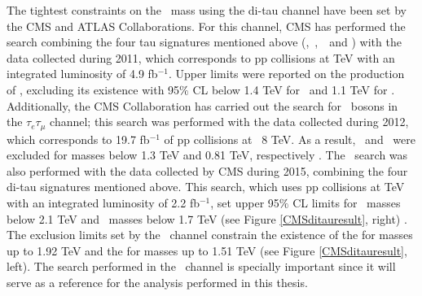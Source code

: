 \begin{itemize}
\noindent The tightest constraints on the \Zprime~mass using the di-tau channel have 
been set by the CMS and ATLAS Collaborations. For this channel, CMS has performed the search combining the four
 tau signatures mentioned above (\tauh \tauh,~\taue \tauh,~\taumu \tauh~and \taue \taumu)
with the data collected during 2011, which corresponds to pp collisions at  TeV with 
an integrated luminosity of 4.9 fb$^{-1}$. Upper limits were reported on the production of \Zprime, excluding 
its existence with 95$\%$ CL below 1.4 TeV for \ZprimeSSM~and 1.1 TeV for \Zprimepsi \cite{CMSZprimetotautaurun1}. Additionally, 
the CMS Collaboration has carried out the search for \Zprime~bosons in the $\tau_{e}\tau_{\mu}$ channel; this search 
was performed with the data collected during 2012, which corresponds to 19.7 fb$^{-1}$ of pp collisions at \sqrts~8 TeV.
As a result, \ZprimeSSM~and \Zprimepsi~were excluded for masses below 1.3 TeV and 0.81 TeV, 
respectively \cite{CMSZprimetotautauemu}. The \Zprimetotautau~search was also performed with the data collected
by CMS during 2015, combining the four di-tau signatures mentioned above. This search, which uses pp collisions 
at  TeV with an integrated luminosity of 2.2 fb$^{-1}$, set upper 95$\%$ CL limits for 
\ZprimeSSM~masses below 2.1 TeV and \ZprimeTAT~masses below
1.7 TeV (see Figure \ref{CMSditauresult}, right) \cite{CMSZprimetotautau2015}. The exclusion limits 
set by the \tauh \tauh~channel constrain the existence of the \ZprimeSSM for masses up to 
1.92 TeV and the \ZprimeTAT for masses up to 1.51 TeV (see Figure \ref{CMSditauresult}, left). The search 
performed in the \tauh \tauh~channel is specially important since it will serve as a reference for the 
analysis performed in this thesis. \\ %


\end{itemize}
